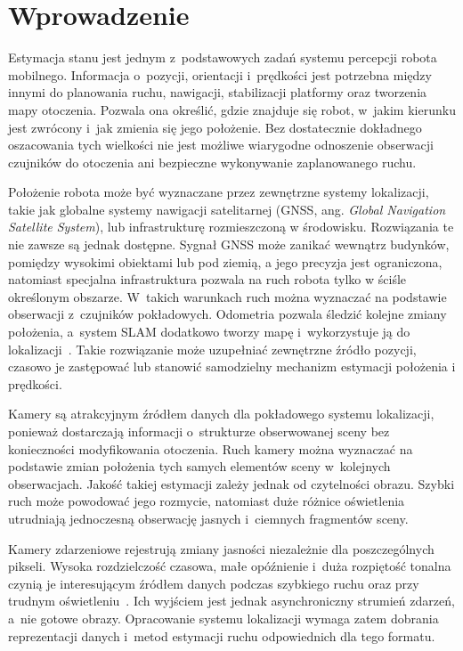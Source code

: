 \chapter{Wprowadzenie}
\label{cha:wprowadzenie}

Estymacja stanu jest jednym z~podstawowych zadań systemu percepcji robota mobilnego. Informacja o~pozycji, orientacji i~prędkości jest potrzebna między innymi do planowania ruchu, nawigacji, stabilizacji platformy oraz tworzenia mapy otoczenia. Pozwala ona określić, gdzie znajduje się robot, w~jakim kierunku jest zwrócony i~jak zmienia się jego położenie. Bez dostatecznie dokładnego oszacowania tych wielkości nie jest możliwe wiarygodne odnoszenie obserwacji czujników do otoczenia ani bezpieczne wykonywanie zaplanowanego ruchu.

Położenie robota może być wyznaczane przez zewnętrzne systemy lokalizacji, takie jak globalne systemy nawigacji satelitarnej (GNSS, ang. \textit{Global Navigation Satellite System}), lub infrastrukturę rozmieszczoną w środowisku. Rozwiązania te nie zawsze są jednak dostępne. Sygnał GNSS może zanikać wewnątrz budynków, pomiędzy wysokimi obiektami lub pod ziemią, a jego precyzja jest ograniczona, natomiast specjalna infrastruktura pozwala na ruch robota tylko w ściśle określonym obszarze. W~takich warunkach ruch można wyznaczać na podstawie obserwacji z~czujników pokładowych. Odometria pozwala śledzić kolejne zmiany położenia, a~system SLAM dodatkowo tworzy mapę i~wykorzystuje ją do lokalizacji~\cite{cadena2016slam}. Takie rozwiązanie może uzupełniać zewnętrzne źródło pozycji, czasowo je zastępować lub stanowić samodzielny mechanizm estymacji położenia i prędkości.

Kamery są atrakcyjnym źródłem danych dla pokładowego systemu lokalizacji, ponieważ dostarczają informacji o~strukturze obserwowanej sceny bez konieczności modyfikowania otoczenia. Ruch kamery można wyznaczać na podstawie zmian położenia tych samych elementów sceny w~kolejnych obserwacjach. Jakość takiej estymacji zależy jednak od czytelności obrazu. Szybki ruch może powodować jego rozmycie, natomiast duże różnice oświetlenia utrudniają jednoczesną obserwację jasnych i~ciemnych fragmentów sceny.

Kamery zdarzeniowe rejestrują zmiany jasności niezależnie dla poszczególnych pikseli. Wysoka rozdzielczość czasowa, małe opóźnienie i~duża rozpiętość tonalna czynią je interesującym źródłem danych podczas szybkiego ruchu oraz przy trudnym oświetleniu~\cite{gallego2022event}. Ich wyjściem jest jednak asynchroniczny strumień zdarzeń, a~nie gotowe obrazy. Opracowanie systemu lokalizacji wymaga zatem dobrania reprezentacji danych i~metod estymacji ruchu odpowiednich dla tego formatu.

